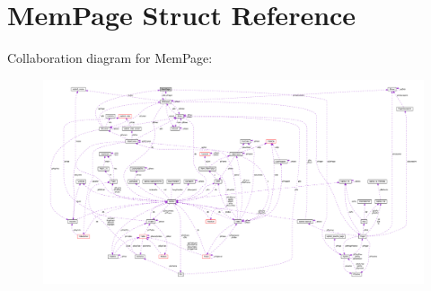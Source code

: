 \hypertarget{structMemPage}{}\section{Mem\+Page Struct Reference}
\label{structMemPage}


Collaboration diagram for Mem\+Page\+:\nopagebreak
\begin{figure}[H]
\begin{center}
\leavevmode
\includegraphics[width=350pt]{structMemPage__coll__graph}
\end{center}
\end{figure}
